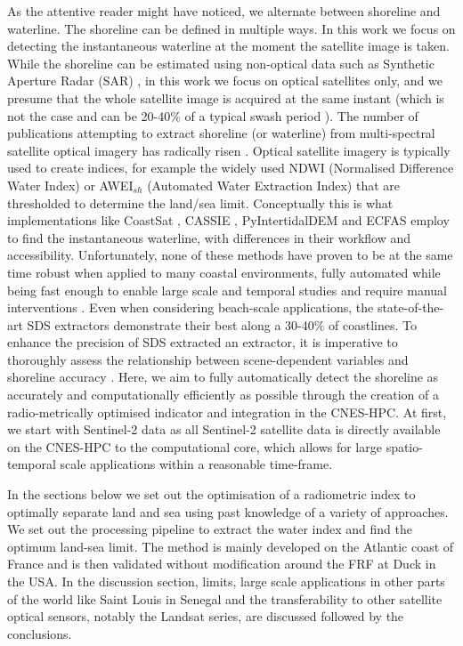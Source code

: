 \documentclass[remotesensing,technicalnote,submit,pdftex,moreauthors]{Definitions/mdpi}
\begin{document}
As the attentive reader might have noticed, we alternate between shoreline and waterline. The shoreline can be defined in multiple ways. In this work we focus on detecting the instantaneous waterline at the moment the satellite image is taken. While the shoreline can be estimated using non-optical data such as Synthetic Aperture Radar (SAR) \citep{Wu:2019, Tajima:2019, Tajima:2021}, in this work we focus on optical satellites only, and we presume that the whole satellite image is acquired at the same instant (which is not the case and can be 20-40\% of a typical swash period \citep{binet2022accurate}). The number of publications attempting to extract shoreline (or waterline) from multi-spectral satellite optical imagery has radically risen \citep{MCALLISTER2022}. Optical satellite imagery is typically used to create indices, for example the widely used NDWI (Normalised Difference Water Index) or AWEI$_{sh}$ (Automated Water Extraction Index) that are thresholded to determine the land/sea limit. Conceptually this is what implementations like CoastSat \citep{VOS2019_google}, CASSIE \citep{ALMEIDA2021_Cassie}, PyIntertidalDEM \citep{Khan2019} and ECFAS \cite{Irazoqui:2023} employ to find the instantaneous waterline, with differences in their workflow and accessibility. Unfortunately, none of these methods have proven to be at the same time robust when applied to many coastal environments, fully automated while being fast enough to enable large scale and temporal studies and require manual interventions \citep{MCALLISTER2022}. Even when considering beach-scale applications, the state-of-the-art SDS extractors demonstrate their best along a 30-40\% of coastlines. To enhance the precision of SDS extracted an extractor, it is imperative to thoroughly assess the relationship between scene-dependent variables and shoreline accuracy \citep{PUCINO:2022}. Here, we aim to fully automatically detect the shoreline as accurately and computationally efficiently as possible through the creation of a radio-metrically optimised indicator and integration in the CNES-HPC. At first, we start with Sentinel-2 data as all Sentinel-2 satellite data is directly available on the CNES-HPC to the computational core, which allows for large spatio-temporal scale applications within a reasonable time-frame.

In the sections below we set out the optimisation of a radiometric index to optimally separate land and sea using past knowledge of a variety of approaches. We set out the processing pipeline to extract the water index and find the optimum land-sea limit. The method is mainly developed on the Atlantic coast of France and is then validated without modification around the FRF at Duck in the USA. In the discussion section, limits, large scale applications in other parts of the world like Saint Louis in Senegal and the transferability to other satellite optical sensors, notably the Landsat series, are discussed followed by the conclusions.
\end{document}
